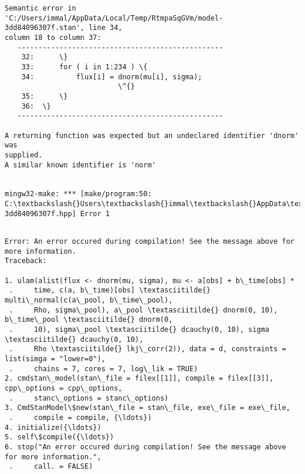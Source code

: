 \documentclass[11pt]{article}
\begin{document}
    \begin{Verbatim}[commandchars=\\\{\}]
Semantic error in
'C:/Users/immal/AppData/Local/Temp/RtmpaSqGVm/model-3dd84096307f.stan', line 34,
column 18 to column 37:
   -------------------------------------------------
    32:      \}
    33:      for ( i in 1:234 ) \{
    34:          flux[i] = dnorm(mu[i], sigma);
                           \^{}
    35:      \}
    36:  \}
   -------------------------------------------------

A returning function was expected but an undeclared identifier 'dnorm' was
supplied.
A similar known identifier is 'norm'


mingw32-make: *** [make/program:50:
C:\textbackslash{}Users\textbackslash{}immal\textbackslash{}AppData\textbackslash{}Local\textbackslash{}Temp\textbackslash{}RtmpaSqGVm\textbackslash{}model-3dd84096307f.hpp] Error 1


    \end{Verbatim}

    \begin{Verbatim}[commandchars=\\\{\}, frame=single, framerule=2mm, rulecolor=\color{outerrorbackground}]
Error: An error occured during compilation! See the message above for more information.
Traceback:

1. ulam(alist(flux <- dnorm(mu, sigma), mu <- a[obs] + b\_time[obs] * 
 .     time, c(a, b\_time)[obs] \textasciitilde{} multi\_normal(c(a\_pool, b\_time\_pool), 
 .     Rho, sigma\_pool), a\_pool \textasciitilde{} dnorm(0, 10), b\_time\_pool \textasciitilde{} dnorm(0, 
 .     10), sigma\_pool \textasciitilde{} dcauchy(0, 10), sigma \textasciitilde{} dcauchy(0, 10), 
 .     Rho \textasciitilde{} lkj\_corr(2)), data = d, constraints = list(simga = "lower=0"), 
 .     chains = 7, cores = 7, log\_lik = TRUE)
2. cmdstan\_model(stan\_file = filex[[1]], compile = filex[[3]], cpp\_options = cpp\_options, 
 .     stanc\_options = stanc\_options)
3. CmdStanModel\$new(stan\_file = stan\_file, exe\_file = exe\_file, 
 .     compile = compile, {\ldots})
4. initialize({\ldots})
5. self\$compile({\ldots})
6. stop("An error occured during compilation! See the message above for more information.", 
 .     call. = FALSE)
    \end{Verbatim}
\end{document}
